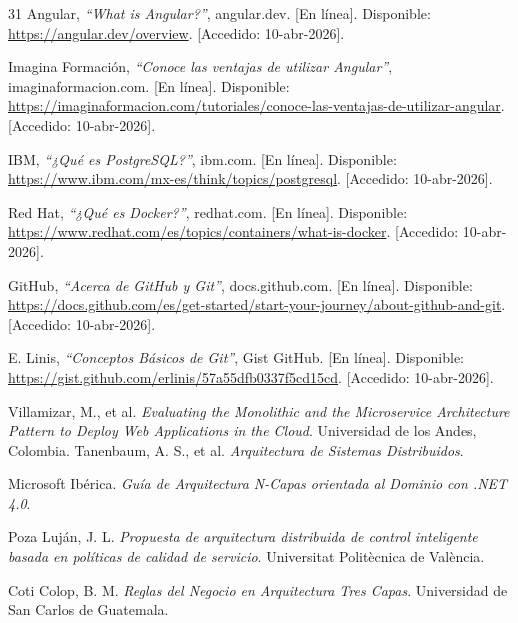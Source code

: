 \begin{thebibliography}{31}
Angular, \textit{``What is Angular?''}, angular.dev. [En línea]. Disponible: \url{https://angular.dev/overview}. [Accedido: 10-abr-2026].

Imagina Formación, \textit{``Conoce las ventajas de utilizar Angular''}, imaginaformacion.com. [En línea]. Disponible: \url{https://imaginaformacion.com/tutoriales/conoce-las-ventajas-de-utilizar-angular}. [Accedido: 10-abr-2026].

IBM, \textit{``¿Qué es PostgreSQL?''}, ibm.com. [En línea]. Disponible: \url{https://www.ibm.com/mx-es/think/topics/postgresql}. [Accedido: 10-abr-2026].

Red Hat, \textit{``¿Qué es Docker?''}, redhat.com. [En línea]. Disponible: \url{https://www.redhat.com/es/topics/containers/what-is-docker}. [Accedido: 10-abr-2026].

GitHub, \textit{``Acerca de GitHub y Git''}, docs.github.com. [En línea]. Disponible: \url{https://docs.github.com/es/get-started/start-your-journey/about-github-and-git}. [Accedido: 10-abr-2026].

E. Linis, \textit{``Conceptos Básicos de Git''}, Gist GitHub. [En línea]. Disponible: \url{https://gist.github.com/erlinis/57a55dfb0337f5cd15cd}. [Accedido: 10-abr-2026].

Villamizar, M., et al. \textit{Evaluating the Monolithic and the Microservice Architecture Pattern to Deploy Web Applications in the Cloud}. Universidad de los Andes, Colombia.
Tanenbaum, A. S., et al. \textit{Arquitectura de Sistemas Distribuidos}.

Microsoft Ibérica. \textit{Guía de Arquitectura N-Capas orientada al Dominio con .NET 4.0}.

Poza Luján, J. L. \textit{Propuesta de arquitectura distribuida de control inteligente basada en políticas de calidad de servicio}. Universitat Politècnica de València.

Coti Colop, B. M. \textit{Reglas del Negocio en Arquitectura Tres Capas}. Universidad de San Carlos de Guatemala.



\end{thebibliography}